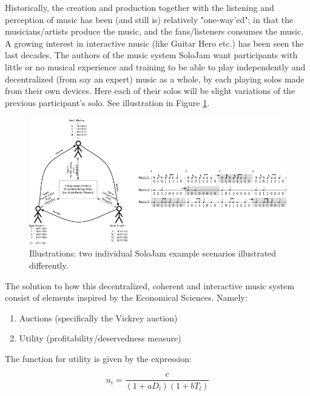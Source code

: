 			Historically, the creation and production together with the listening and perception of music has been (and still is) relatively "one-way'ed"; in that the musicians/artists produce the music, and the fans/listeners consumes the music. A growing interest in interactive music (like Guitar Hero etc.) has been seen the last decades. The authors of the music system SoloJam \cite{solojam} want participants with little or no musical experience and training to be able to play independently and decentralized (from say an expert) music as a whole, by each playing solos made from their own devices. Here each of their solos will be slight variations of the previous participant's solo. See illustration in Figure \ref{fig:solojam}.

			\begin{figure}[!htp]
			\centering
				\includegraphics[width=\columnwidth]{Assets/DocSegments/Chapters/Background/Figures/Schema/SoloJam.pdf}
				\caption{Illustrations: two individual SoloJam example scenarios illustrated differently.}
				\label{fig:solojam}
			\end{figure}

			The solution to how this decentralized, coherent and interactive music system consist of elements inspired by the Economical Sciences. Namely:

			\begin{enumerate}
				\item Auctions (specifically the Vickrey auction)
				\item Utility (profitability/deservedness measure)
			\end{enumerate}

			The function for utility is given by the expression:

			\begin{equation}
			u_i = \frac{c}{(1+a D_l)(1+b T_l)}
			\end{equation}
			\newline

